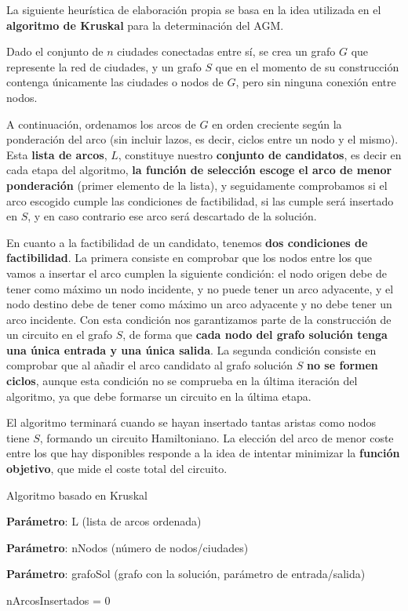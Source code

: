 La siguiente heurística de elaboración propia se basa en la idea utilizada en el \textbf{algoritmo de Kruskal} para la determinación del AGM. 

Dado el conjunto de $n$ ciudades conectadas entre sí, se crea un grafo $G$ que represente la red de ciudades, y un grafo $S$ que en el momento de su construcción contenga únicamente las ciudades o nodos de $G$, pero sin ninguna conexión entre nodos.

A continuación, ordenamos los arcos de $G$ en orden creciente según la ponderación del arco (sin incluir lazos, es decir, ciclos entre un nodo y el mismo). Esta \textbf{lista de arcos}, $L$, constituye nuestro \textbf{conjunto de candidatos}, es decir en cada etapa del algoritmo, \textbf{la función de selección escoge el arco de menor ponderación} (primer elemento de la lista), y seguidamente comprobamos si el arco escogido cumple las condiciones de factibilidad, si las cumple será insertado en $S$, y en caso contrario ese arco será descartado de la solución. 

En cuanto a la factibilidad de un candidato, tenemos \textbf{dos condiciones de factibilidad}. La primera consiste en comprobar que los nodos entre los que vamos a insertar el arco cumplen la siguiente condición: el nodo origen debe de tener como máximo un nodo incidente, y no puede tener un arco adyacente, y el nodo destino debe de tener como máximo un arco adyacente y no debe tener un arco incidente. Con esta condición nos garantizamos parte de la construcción de un circuito en el grafo $S$, de forma que \textbf{cada nodo del grafo solución tenga una única entrada y una única salida}. La segunda condición consiste en comprobar que al añadir el arco candidato al grafo solución $S$ \textbf{no se formen ciclos}, aunque esta condición no se comprueba en la última iteración del algoritmo, ya que debe formarse un circuito en la última etapa.

El algoritmo terminará cuando se hayan insertado tantas aristas como nodos tiene $S$, formando un circuito Hamiltoniano. La elección del arco de menor coste entre los que hay disponibles responde a la idea de intentar minimizar la \textbf{función objetivo}, que mide el coste total del circuito.

\begin{algorithm}
	\caption{Algoritmo basado en Kruskal}\label{alg:bas_kruscal}
	\begin{minipage}{0.92\textwidth}
		\textbf{Parámetro}: L (lista de arcos ordenada)
		
		\textbf{Parámetro}: nNodos (número de nodos/ciudades)
		
		\textbf{Parámetro}: grafoSol (grafo con la solución, parámetro de entrada/salida)
	\end{minipage}
	nArcosInsertados = 0\;
\end{algorithm}

